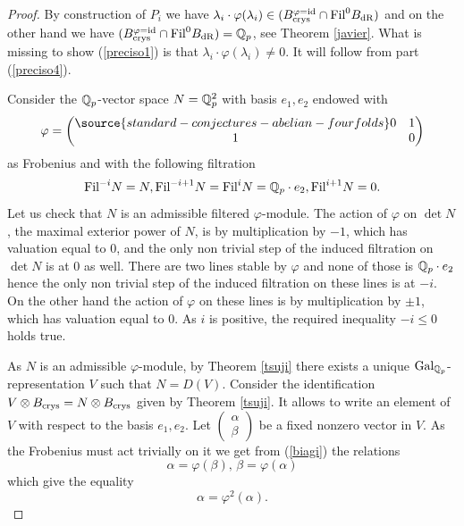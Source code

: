 \begin{proof}

By construction of $P_i$ we have   $ \lambda_i \cdot\varphi(\lambda_i) \in (B_{\textnormal{crys}}^{\varphi=\mathrm{id}} \cap \textnormal{Fil}^0B_{\mathrm{dR}})$  and on the other hand we have  $(B_{\textnormal{crys}}^{\varphi=\mathrm{id}} \cap \textnormal{Fil}^0B_{\mathrm{dR}})=\mathbb{Q}_p$, see Theorem \ref{javier}. What is missing to show (\ref{preciso1}) is that $\lambda_i \cdot\varphi(\lambda_i)\neq 0.$ It will follow from part (\ref{preciso4}).

  Consider the $\mathbb{Q}_p$-vector space $N=\mathbb{Q}_p^2$ with basis $e_1,e_2$ endowed with
\begin{equation}\label{biagi}\varphi=\begin{pmatrix}
\source{standard-conjectures-abelian-fourfolds}
0 & 1 \\
1 & 0
\end{pmatrix}
\end{equation}
as Frobenius and with the following filtration
\[\textnormal{Fil}^{-i}N=N, \textnormal{Fil}^{-i+1}N =\textnormal{Fil}^i N=\mathbb{Q}_p\cdot e_2, \textnormal{Fil}^{i+1} N=0.  \]
Let us  check that $N$ is an admissible filtered $\varphi$-module.  The action of $\varphi$ on $\det N$, the maximal exterior power of $N$, is by multiplication by $-1$, which has valuation equal to $0$, and the only non trivial step of the induced filtration on $\det N$ is at $0$ as well. There are two lines  stable by $\varphi$ and none of those is $\mathbb{Q}_p\cdot e_2$ hence the only non trivial step of the induced filtration on these lines is at $-i$. On the other hand the action of $\varphi$ on these lines is by multiplication by $\pm 1$, which has valuation equal to $0$. As $i$ is  positive, the required inequality  $-i \leq 0$ holds true.

 As $N$ is an admissible $\varphi$-module, by Theorem \ref{tsuji} there exists a unique $\textnormal{Gal}_{\mathbb{Q}_p}$-representation $V$ such that $N=D(V)$.
 Consider the identification $V \otimes B_{\textnormal{crys}}= N \otimes B_{\textnormal{crys}}$ given by  Theorem \ref{tsuji}. It allows to write an element of $V$ with respect to the basis $e_1,e_2$. Let $\begin{pmatrix} \alpha \\
\beta
 \end{pmatrix}$ be a fixed nonzero vector in $V$. As the Frobenius must act trivially on it we get from (\ref{biagi})  the relations
 \[ \alpha=  \varphi(\beta), \,
   \beta= \varphi(\alpha) \]
  which give the equality
  \begin{equation}  \alpha=  \varphi^2(\alpha).\end{equation}


\end{proof}
